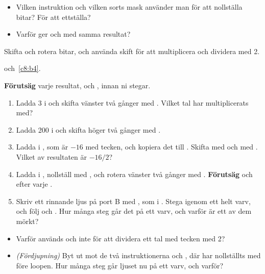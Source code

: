 \begin{itemize}
  \item Vilken instruktion och vilken sorts mask använder man för att nollställa bitar? För att
    ettställa?
  \item Varför ger  och  med  samma resultat?
\end{itemize}


\label{lab3:d8}
Skifta och rotera bitar, och använda skift för att multiplicera och dividera med 2.

 och~\ref{c8:b4}.

\textbf{Förutsäg} varje resultat, och , innan ni stegar.
\begin{enumerate}
  \item Ladda 3 i  och skifta vänster två gånger med . Vilket tal har
     multiplicerats med?
  \item Ladda 200 i  och skifta höger två gånger med .
  \item Ladda  i , som är $-16$ med tecken, och kopiera det till
    . Skifta  med  och  med . Vilket av
    resultaten är $-16 / 2$?
  \item Ladda  i , nollställ  med , och rotera vänster
    två gånger med . \textbf{Förutsäg}  och  efter varje .
  \item Skriv ett rinnande ljus på port B med , som i . Stega igenom
    ett helt varv, och följ  och . Hur många steg går det på ett varv, och
    varför är ett av dem mörkt?
\end{enumerate}

\begin{itemize}
  \item Varför används  och inte  för att dividera ett tal med tecken med 2?
  \item \emph{(Fördjupning)} Byt ut  mot de två instruktionerna  och
    , där  har nollställts med  före loopen. Hur många steg
    går ljuset nu på ett varv, och varför?
\end{itemize}


